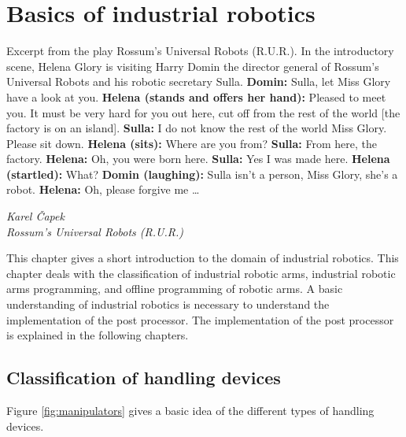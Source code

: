 ﻿\chapter{Basics of industrial robotics \label{chap:basics}}

\epigraph{

Excerpt from the play Rossum’s Universal Robots (R.U.R.).\break
In the introductory scene, Helena Glory is visiting Harry Domin the director general of Rossum’s Universal Robots and his robotic secretary Sulla.\break
\break
\textbf{Domin:} Sulla, let Miss Glory have a look at you.\break
\textbf{Helena (stands and offers her hand):} Pleased to meet you. It must be very hard for you out here, cut off from the rest of the world [the factory is on an island].\break
\textbf{Sulla:} I do not know the rest of the world Miss Glory. Please sit down.\break
\textbf{Helena (sits):} Where are you from?\break
\textbf{Sulla:} From here, the factory.\break
\textbf{Helena:} Oh, you were born here.\break
\textbf{Sulla:} Yes I was made here.\break
\textbf{Helena (startled):} What?\break
\textbf{Domin (laughing):} Sulla isn’t a person, Miss Glory, she’s a robot.\break
\textbf{Helena:} Oh, please forgive me …
}{\textit{Karel Čapek \\ Rossum’s Universal Robots (R.U.R.)}}

This chapter gives a short introduction to the domain of industrial robotics. This chapter deals with the classification of industrial robotic arms, industrial robotic arms programming, and offline programming of robotic arms. A basic understanding of industrial robotics is necessary to understand the implementation of the post processor. The implementation of the post processor is explained in the following chapters.

\section{Classification of handling devices}

Figure \ref{fig:manipulators} gives a basic idea of the different types of handling devices. 



